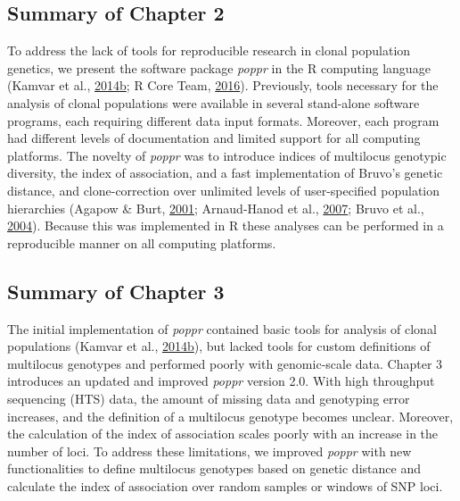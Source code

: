 \documentclass[double,11pt]{beavtex}
\begin{document}
  \subsection{Summary of Chapter 2}\label{summary-of-chapter-2}
  
  To address the lack of tools for reproducible research in clonal
  population genetics, we present the software package \emph{poppr} in the
  R computing language (Kamvar et al.,
  \protect\hyperlink{ref-kamvar2014poppr}{2014}\protect\hyperlink{ref-kamvar2014poppr}{b};
  R Core Team, \protect\hyperlink{ref-R2016}{2016}). Previously, tools
  necessary for the analysis of clonal populations were available in
  several stand-alone software programs, each requiring different data
  input formats. Moreover, each program had different levels of
  documentation and limited support for all computing platforms. The
  novelty of \emph{poppr} was to introduce indices of multilocus genotypic
  diversity, the index of association, and a fast implementation of
  Bruvo's genetic distance, and clone-correction over unlimited levels of
  user-specified population hierarchies (Agapow \& Burt,
  \protect\hyperlink{ref-Agapow_2001}{2001}; Arnaud-Hanod et al.,
  \protect\hyperlink{ref-arnaud2007standardizing}{2007}; Bruvo et al.,
  \protect\hyperlink{ref-bruvo2004simple}{2004}). Because this was
  implemented in R these analyses can be performed in a reproducible
  manner on all computing platforms.
  
  \subsection{Summary of Chapter 3}\label{summary-of-chapter-3}
  
  The initial implementation of \emph{poppr} contained basic tools for
  analysis of clonal populations (Kamvar et al.,
  \protect\hyperlink{ref-kamvar2014poppr}{2014}\protect\hyperlink{ref-kamvar2014poppr}{b}),
  but lacked tools for custom definitions of multilocus genotypes and
  performed poorly with genomic-scale data. Chapter 3 introduces an
  updated and improved \emph{poppr} version 2.0. With high throughput
  sequencing (HTS) data, the amount of missing data and genotyping error
  increases, and the definition of a multilocus genotype becomes unclear.
  Moreover, the calculation of the index of association scales poorly with
  an increase in the number of loci. To address these limitations, we
  improved \emph{poppr} with new functionalities to define multilocus
  genotypes based on genetic distance and calculate the index of
  association over random samples or windows of SNP loci.
  
\end{document}
